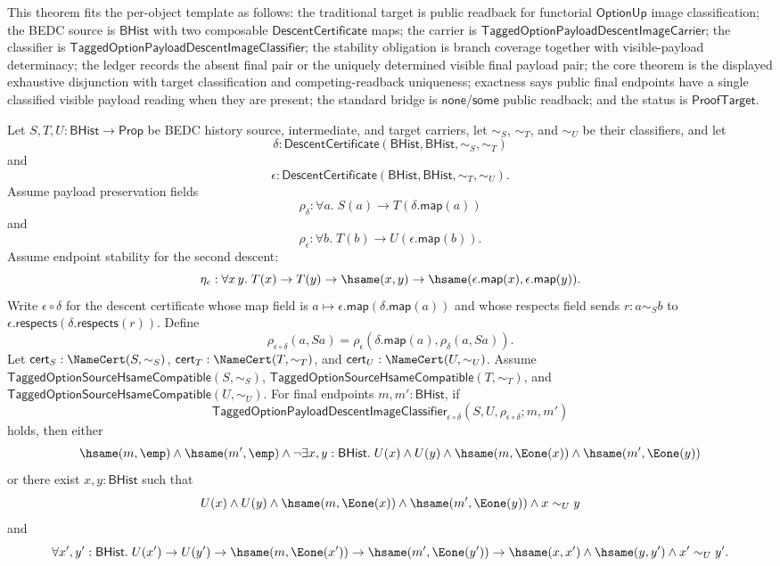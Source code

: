 \begin{theorem}
\label{thm:tagged-option-composite-image-classifier-public-readback-single-valued}
This theorem fits the per-object template as follows: the traditional target is
public readback for functorial $\mathsf{OptionUp}$ image classification; the
BEDC source is $\mathsf{BHist}$ with two composable
$\mathsf{DescentCertificate}$ maps; the carrier is
$\mathsf{TaggedOptionPayloadDescentImageCarrier}$; the classifier is
$\mathsf{TaggedOptionPayloadDescentImageClassifier}$; the stability obligation
is branch coverage together with visible-payload determinacy; the ledger records
the absent final pair or the uniquely determined visible final payload pair; the
core theorem is the displayed exhaustive disjunction with target classification
and competing-readback uniqueness; exactness says public final endpoints have a
single classified visible payload reading when they are present; the standard
bridge is $\mathsf{none}$/$\mathsf{some}$ public readback; and the status is
$\mathsf{ProofTarget}$.

Let $S,T,U:\mathsf{BHist}\to\mathsf{Prop}$ be BEDC history source,
intermediate, and target carriers, let $\sim_S$, $\sim_T$, and $\sim_U$ be their
classifiers, and let
$$
\delta:\mathsf{DescentCertificate}(\mathsf{BHist},\mathsf{BHist},\sim_S,\sim_T)
$$
and
$$
\epsilon:\mathsf{DescentCertificate}(\mathsf{BHist},\mathsf{BHist},\sim_T,\sim_U).
$$
Assume payload preservation fields
$$
\rho_{\delta}:\forall a.\;S(a)\to T(\delta.\mathsf{map}(a))
$$
and
$$
\rho_{\epsilon}:\forall b.\;T(b)\to U(\epsilon.\mathsf{map}(b)).
$$
Assume endpoint stability for the second descent:
$$
\eta_{\epsilon}:\forall x\,y.\;
T(x)\to T(y)\to \hsame(x,y)\to
\hsame(\epsilon.\mathsf{map}(x),\epsilon.\mathsf{map}(y)).
$$
Write $\epsilon\circ\delta$ for the descent certificate whose map field is
$a\mapsto\epsilon.\mathsf{map}(\delta.\mathsf{map}(a))$ and whose respects field
sends $r:a\sim_S b$ to
$\epsilon.\mathsf{respects}(\delta.\mathsf{respects}(r))$. Define
$$
\rho_{\epsilon\circ\delta}(a,Sa)=
\rho_{\epsilon}(\delta.\mathsf{map}(a),\rho_{\delta}(a,Sa)).
$$
Let $\mathsf{cert}_S:\NameCert(S,\sim_S)$,
$\mathsf{cert}_T:\NameCert(T,\sim_T)$, and
$\mathsf{cert}_U:\NameCert(U,\sim_U)$. Assume
$\mathsf{TaggedOptionSourceHsameCompatible}(S,\sim_S)$,
$\mathsf{TaggedOptionSourceHsameCompatible}(T,\sim_T)$, and
$\mathsf{TaggedOptionSourceHsameCompatible}(U,\sim_U)$. For final endpoints
$m,m':\mathsf{BHist}$, if
$$
\mathsf{TaggedOptionPayloadDescentImageClassifier}_{\epsilon\circ\delta}
(S,U,\rho_{\epsilon\circ\delta};m,m')
$$
holds, then either
$$
\hsame(m,\emp)\land \hsame(m',\emp)\land
\neg\exists x,y:\mathsf{BHist}.\;
U(x)\land U(y)\land
\hsame(m,\Eone(x))\land
\hsame(m',\Eone(y))
$$
or there exist $x,y:\mathsf{BHist}$ such that
$$
U(x)\land U(y)\land
\hsame(m,\Eone(x))\land
\hsame(m',\Eone(y))\land
x\sim_U y
$$
and
$$
\forall x',y':\mathsf{BHist}.\;
U(x')\to U(y')\to
\hsame(m,\Eone(x'))\to
\hsame(m',\Eone(y'))\to
\hsame(x,x')\land \hsame(y,y')\land x'\sim_U y'.
$$
\end{theorem}
